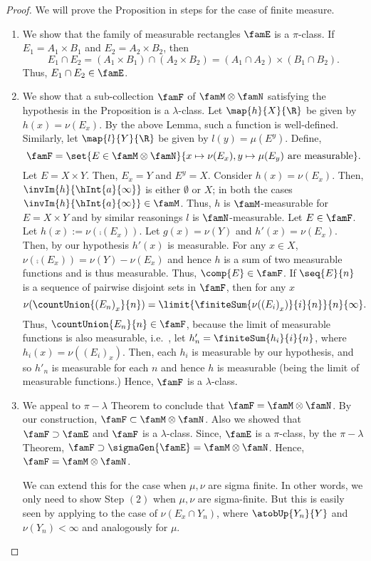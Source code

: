 \begin{proof}
    We will prove the Proposition in steps for the case of finite measure.
    \begin{enumerate}
	\item 
	    We show that the family of measurable rectangles $\famE$ is a $\pi$-class.
	    If $E_1 = A_1\times B_1$ and $E_2 = A_2 \times B_2$, then 
	    \[E_1\cap E_2 = (A_1\times B_1)\cap (A_2\times B_2) = (A_1\cap A_2)\times (B_1\cap B_2).\]
	    Thus, $E_1\cap E_2 \in \famE$.
	\item 
	    We show that a sub-collection $\famF$ of $\famM\otimes\famN$ satisfying the hypothesis in the
	    Proposition is a $\lambda$-class.
	    Let $\map{h}{X}{\R}$ be given by $h(x) = \nu(E_x)$. By the above Lemma, such a function is
	    well-defined. Similarly, let $\map{l}{Y}{\R}$ be given by $l(y) = \mu(E^{y})$.
	    Define,
	    \[\famF = 
	\set{E\in\famM\otimes\famN}{x\mapsto\nu(E_x),y\mapsto\mu(E_y)\hspace{0.05in}\text{are measurable}}.\]
	    Let $E = X \times Y$. Then, $E_x = Y$ and $E^{y} = X$. Consider $h(x) = \nu(E_x)$. 
	    Then, $\invIm{h}{\hInt{a}{\infty}}$ is
	    either $\emptyset$ or $X$; in both the cases $\invIm{h}{\hInt{a}{\infty}} \in \famM$. Thus, $h$ is
	    $\famM$-measurable for $E = X \times Y$ and by similar reasonings $l$ is $\famN$-measurable.
	    Let $E \in \famF$. Let $h(x) := \nu(\comp{(E_x)})$. Let $g(x) = \nu(Y)$ and $h'(x) = \nu(E_x)$.
	    Then, by our hypothesis $h'(x)$ is measurable. 
	    For any $x \in X$, $\nu(\comp{(E_x)}) = \nu(Y) - \nu(E_x)$ and hence $h$ is 
	    a sum of two measurable functions and is thus measurable. Thus, $\comp{E}\in \famF$. 
	    If $\seq{E}{n}$ is a sequence of pairwise disjoint sets in $\famF$, then for any $x$
	    \[\nu(\countUnion{{(E_n)}_x}{n}) = \limit{\finiteSum{\nu({(E_i)}_x)}{i}{n}}{n}{\infty}.\]
	    Thus, $\countUnion{E_n}{n} \in \famF$, because the limit of measurable functions is also
	    measurable, i.e.~, let $h'_n = \finiteSum{h_i}{i}{n}$, where $h_i(x) = \nu({(E_i)}_x)$. Then, each
	    $h_i$ is measurable by our hypothesis, and so $h'_n$ is measurable for each $n$ and hence $h$ is
	    measurable (being the limit of measurable functions.)
	    Hence, $\famF$ is a $\lambda$-class.
	\item
	    We appeal to $\pi-\lambda$ Theorem to conclude that $\famF = \famM\otimes\famN$.
	    By our construction, $\famF \subset \famM\otimes\famN$. Also we showed that $\famF \supset \famE$
	    and $\famF$ is a $\lambda$-class. Since, $\famE$ is a $\pi$-class, by the $\pi-\lambda$ Theorem,
	    $\famF \supset \sigmaGen{\famE} = \famM\otimes\famN$. Hence, $\famF = \famM\otimes\famN$.

	    We can extend this for the case when $\mu,\nu$ are sigma finite. In other words, we only need to
	    show Step $(2)$ when $\mu,\nu$ are sigma-finite. But this is easily seen by applying to the case
	    of $\nu(E_x\cap Y_n)$, where $\atobUp{Y_n}{Y}$ and $\nu(Y_n) < \infty$ and analogously for $\mu$.
    \end{enumerate}
\end{proof}

